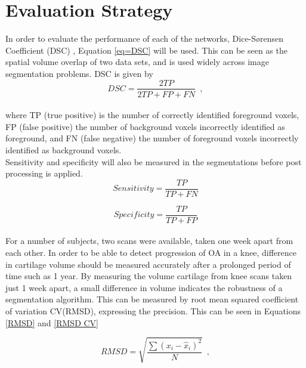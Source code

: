 \documentclass[11pt,a4paper]{memoir}
\numberwithin{figure}{section}
\numberwithin{table}{section}
\numberwithin{equation}{section}
\begin{document}
\section{Evaluation Strategy}
In order to evaluate the performance of each of the networks, Dice-Sørensen Coefficient (DSC) \cite{Zou2004StatisticalIndex.}, Equation \ref{eq=DSC} will be used. This can be seen as the spatial volume overlap of two data sets, and is used widely across image segmentation problems. DSC is given by \\

\begin{equation}
DSC = \frac{2TP}{2TP + FP + FN}
\label{eq=DSC}  \enspace,
\end{equation}\\
where TP (true positive) is the number of correctly identified foreground voxels, FP (false positive) the number of background voxels incorrectly identified as foreground, and FN (false negative) the number of foreground voxels incorrectly identified as background voxels.\\

Sensitivity and specificity will also be measured in the segmentations before post processing is applied. \\


\begin{equation}
Sensitivity =  \frac{ TP }{ TP + FN} 
\label{eq=sens}
\end{equation}
 
\begin{equation}
Specificity  =  \frac{ TP}{ TP + FP} 
\label{eq=spec}
\end{equation}
\\

For a number of subjects, two scans were available, taken one week apart from each other. In order to be able to detect progression of OA in a knee, difference in cartilage volume should be measured accurately after a prolonged period of time such as 1 year. By measuring the volume cartilage from knee scans taken just 1 week apart, a small difference in volume indicates the robustness of a segmentation algorithm. This can be measured by root mean squared coefficient of variation CV(RMSD), expressing the precision. This can be seen in Equations \ref{RMSD} and \ref{RMSD CV}

\begin{equation}
RMSD = \sqrt{\frac{\sum \left ( x_{i} - \hat{x}_{i}  \right )^{2}}{N}}\enspace,
\label{RMSD}
\end{equation}
\end{document}
